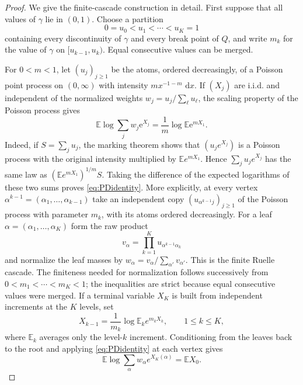 \documentclass[11pt]{article}
\numberwithin{equation}{section}
\theoremstyle{plain}
\theoremstyle{definition}
\newcommand{\E}{\mathbb E}
\newcommand{\1}{\mathbf 1}
\newcommand{\dd}{\,\mathrm d}
\newcommand{\e}{\mathrm e}
\begin{document}
\begin{proof}
We give the finite-cascade construction in detail.  First suppose
that all values of $\gamma$ lie in $(0,1)$.  Choose a partition
\begin{equation}
 0=u_0<u_1<\cdots<u_K=1
 \label{eq:GTpartition}
\end{equation}
containing every discontinuity of $\gamma$ and every break point of
$Q$, and write $m_k$ for the value of $\gamma$ on
$[u_{k-1},u_k)$.  Equal consecutive values can be merged.

For $0<m<1$, let $(u_j)_{j\ge1}$ be the atoms, ordered decreasingly,
of a Poisson point process on $(0,\infty)$ with intensity
$m x^{-1-m}\,\dd x$.  If $(X_j)$ are i.i.d. and independent of the
normalized weights $w_j=u_j/\sum_\ell u_\ell$, the scaling property of
the Poisson process gives
\begin{equation}
 \E\log\sum_jw_j\e^{X_j}
 =\frac1m\log\E\e^{mX_1}.
 \label{eq:PDidentity}
\end{equation}
Indeed, if $S=\sum_j u_j$, the marking theorem shows that
$(u_je^{X_j})$ is a Poisson process with the original intensity
multiplied by $\E e^{mX_1}$.  Hence
$\sum_j u_je^{X_j}$ has the same law as
$(\E e^{mX_1})^{1/m}S$.  Taking the difference of the expected
logarithms of these two sums proves \eqref{eq:PDidentity}.
More explicitly, at every vertex
$\alpha^{k-1}=(\alpha_1,\ldots,\alpha_{k-1})$ take an independent
copy $(u_{\alpha^{k-1}j})_{j\ge1}$ of the Poisson process with
parameter $m_k$, with its atoms ordered decreasingly.  For a leaf
$\alpha=(\alpha_1,\ldots,\alpha_K)$ form the raw product
\[
 v_\alpha=\prod_{k=1}^K u_{\alpha^{k-1}\alpha_k}
\]
and normalize the leaf masses by
$w_\alpha=v_\alpha/\sum_{\alpha'}v_{\alpha'}$.  This is the finite
Ruelle cascade.  The finiteness needed for normalization follows
successively from $0<m_1<\cdots<m_K<1$; the inequalities are strict
because equal consecutive values were merged.  If a terminal variable
$X_K$ is built from independent increments at the $K$ levels, set
\begin{equation}
 X_{k-1}=\frac1{m_k}\log\E_k e^{m_kX_k},
 \qquad 1\le k\le K,
 \label{eq:cascaderecursion}
\end{equation}
where $\E_k$ averages only the level-$k$ increment.  Conditioning
from the leaves back to the root and applying
\eqref{eq:PDidentity} at each vertex gives
\begin{equation}
 \E\log\sum_\alpha w_\alpha e^{X_K(\alpha)}=\E X_0.
 \label{eq:cascadeidentity}
\end{equation}


\end{proof}
\end{document}
